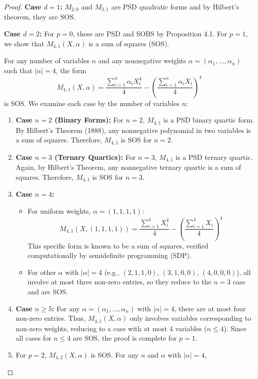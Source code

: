 \documentclass{article}
\begin{document}
\begin{proof}
	\textbf{Case $d=1$:}
$M_{2,0}$ and $M_{2,1}$ are PSD quadratic forms and by Hilbert's theorem, they are SOS.

	\textbf{Case $d=2$:}
For $p=0$, these are PSD and SOBS by Proposition 4.1.
For $p=1$, we show that $M_{4,1}(X, \alpha)$ is a sum of squares (SOS).

For any number of variables $n$ and any nonnegative weights $\alpha = (\alpha_1, \dots, \alpha_n)$ such that $|\alpha| = 4$, 
the form
\[
   M_{4,1}(X, \alpha) = \frac{\sum_{i=1}^n \alpha_i X_i^4}{4} - \left( \frac{\sum_{i=1}^n \alpha_i X_i}{4} \right)^4
\]
is SOS. We examine each case by the number of variables $n$:
\begin{enumerate}
   \item \textbf{Case $n=2$ (Binary Forms):} For $n=2$, $M_{4,1}$ is a PSD binary quartic form. By Hilbert's Theorem (1888), 
   any nonnegative polynomial in two variables is a sum of squares. Therefore, $M_{4,1}$ is SOS for $n=2$.
   \item \textbf{Case $n=3$ (Ternary Quartics):} For $n=3$, $M_{4,1}$ is a PSD ternary quartic. Again, by Hilbert's Theorem, 
   any nonnegative ternary quartic is a sum of squares. Therefore, $M_{4,1}$ is SOS for $n=3$.
   \item \textbf{Case $n=4$:}
      \begin{itemize}
         \item For uniform weights, $\alpha = (1,1,1,1)$:
         \[
            M_{4,1}(X, (1,1,1,1)) = \frac{\sum_{i=1}^4 X_i^4}{4} - \left( \frac{\sum_{i=1}^4 X_i}{4} \right)^4
         \]
         This specific form is known to be a sum of squares, verified computationally by semidefinite programming (SDP).
         \item For other $\alpha$ with $|\alpha|=4$ (e.g., $(2,1,1,0)$, $(3,1,0,0)$, $(4,0,0,0)$), all involve at most 
         three non-zero entries, so they reduce to the $n=3$ case and are SOS.
      \end{itemize}
   \item \textbf{Case $n \geq 5$:}
      For any $\alpha = (\alpha_1, \dots, \alpha_n)$ with $|\alpha|=4$, there are at most four non-zero entries. Thus, 
      $M_{4,1}(X, \alpha)$ only involves variables corresponding to non-zero weights, reducing to a case with at most $4$ 
      variables ($n \leq 4$). Since all cases for $n \leq 4$ are SOS, the proof is complete for $p=1$.
   \item For $p=2$, $M_{4,2}(X, \alpha)$ is SOS. For any $n$ and $\alpha$ with $|\alpha|=4$,

\end{enumerate}
\end{proof}
\end{document}
